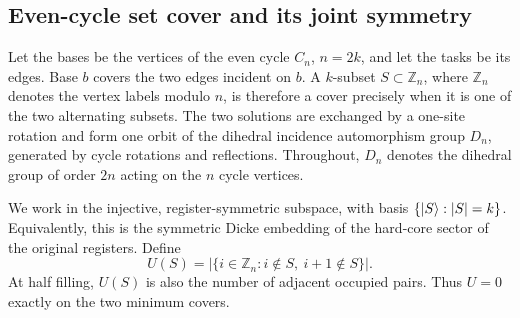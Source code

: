 \subsection{Even-cycle set cover and its joint symmetry}

Let the bases be the vertices of the even cycle $C_n$, $n=2k$, and let the
tasks be its edges.  Base $b$ covers the two edges incident on $b$.  A
$k$-subset $S\subset\mathbb Z_n$, where $\mathbb Z_n$ denotes the vertex
labels modulo $n$, is therefore a cover precisely when it is
one of the two alternating subsets.  The two solutions are exchanged by a
one-site rotation and form one orbit of the dihedral incidence automorphism
group $D_n$, generated by cycle rotations and reflections.  Throughout,
$D_n$ denotes the dihedral group of order $2n$ acting on the $n$ cycle
vertices.

We work in the injective, register-symmetric subspace, with basis
$\{\lvert S\rangle:|S|=k\}$.  Equivalently, this is the symmetric Dicke embedding of
the hard-core sector of the original registers.  Define
\begin{equation}
 U(S)=|\{i\in\mathbb Z_n:i\notin S,\ i+1\notin S\}|.
 \label{eq:cycle-energy}
\end{equation}
At half filling, $U(S)$ is also the number of adjacent occupied pairs.  Thus
$U=0$ exactly on the two minimum covers.

